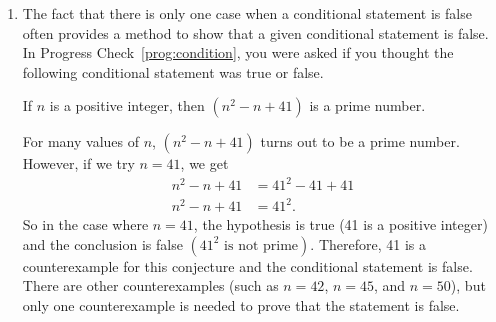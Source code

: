 \begin{enumerate}
%

\item The fact that there is only one case when a conditional statement is false often provides a method to show that a given conditional statement is false.  In Progress Check~\ref{prog:condition}, you were asked if you thought the following conditional statement was true or false.
\begin{center}
If  $n$  is a positive integer, then  $\left( {n^2  - n + 41} \right)$ is a prime number.
\end{center}
For many values of $n$, $\left( {n^2  - n + 41} \right)$ turns out to be a prime number.  However, if we try  $n = 41$, we get
\begin{align*}
  n^2  - n + 41 &= 41^2  - 41 + 41 \\ 
  n^2  - n + 41 &= 41^2 . 
\end{align*}
So in the case where  $n = 41$, the hypothesis is true  (41 is a positive integer) and the conclusion is false $\left( {41^2 \text{ is not prime}} \right)$.  Therefore, 41 is a counterexample for this conjecture and the conditional statement is false.
There are other counterexamples (such as $n = 42$, $n = 45$, and  $n = 50$), but only one counterexample is needed to prove that the statement is false.


\end{enumerate}
